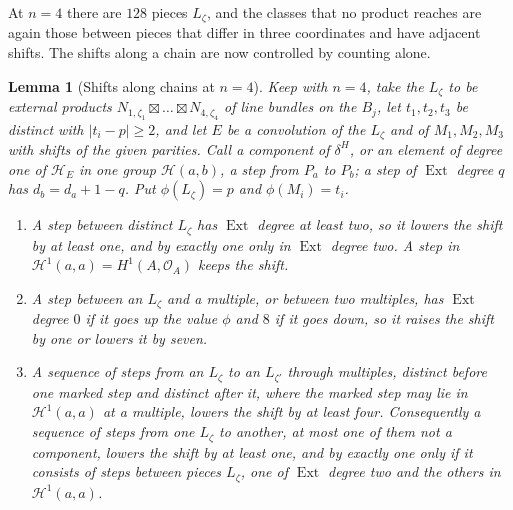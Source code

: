 \documentclass[11pt,reqno]{amsart}
\theoremstyle{plain}
\newtheorem{lemma}[theorem]{Lemma}
\theoremstyle{definition}
\theoremstyle{remark}
\newcommand{\cO}{\mathcal{O}}
\newcommand{\cH}{\mathcal{H}}
\DeclareMathOperator{\Ext}{Ext}
\begin{document}
At $n=4$ there are $128$ pieces $L_{\zeta}$, and the classes that no
product reaches are again those between pieces that differ in three
coordinates and have adjacent shifts. The shifts along a chain are now
controlled by counting alone.

\begin{lemma}[Shifts along chains at $n=4$]\label{lem:efourshifts}
Keep  with $n=4$, take the $L_{\zeta}$ to be external
products $N_{1,\zeta_{1}}\boxtimes\dots\boxtimes N_{4,\zeta_{4}}$ of line
bundles on the $B_{j}$, let $t_{1},t_{2},t_{3}$ be distinct with
$|t_{i}-p|\ge2$, and let $E$ be a convolution of the $L_{\zeta}$ and of
$M_{1},M_{2},M_{3}$ with shifts of the given parities. Call a component of
$\delta^{H}$, or an element of degree one of $\cH_{E}$ in one group
$\cH(a,b)$, a step from $P_{a}$ to $P_{b}$; a step of $\Ext$ degree $q$ has
$d_{b}=d_{a}+1-q$. Put $\phi(L_{\zeta})=p$ and $\phi(M_{i})=t_{i}$.
\begin{enumerate}[label=\textup{(\roman*)},leftmargin=2.6em,itemsep=2pt]
\item A step between distinct $L_{\zeta}$ has $\Ext$ degree at least two, so
  it lowers the shift by at least one, and by exactly one only in $\Ext$
  degree two. A step in $\cH^{1}(a,a)=H^{1}(A,\cO_{A})$ keeps the shift.
\item A step between an $L_{\zeta}$ and a multiple, or between two
  multiples, has $\Ext$ degree $0$ if it goes up the value $\phi$ and $8$ if
  it goes down, so it raises the shift by one or lowers it by seven.
\item A sequence of steps from an $L_{\zeta}$ to an $L_{\zeta'}$ through
  multiples, distinct before one marked step and distinct after it, where
  the marked step may lie in $\cH^{1}(a,a)$ at a multiple, lowers the shift
  by at least four. Consequently a sequence of steps from one $L_{\zeta}$ to
  another, at most one of them not a component, lowers the shift by at least
  one, and by exactly one only if it consists of steps between pieces
  $L_{\zeta}$, one of $\Ext$ degree two and the others in $\cH^{1}(a,a)$.
\end{enumerate}
\end{lemma}
\end{document}
